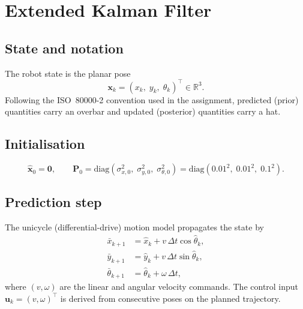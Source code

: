 \documentclass[a4paper,11pt]{report}
\begin{document}
\section{Extended Kalman Filter}

\subsection{State and notation}

The robot state is the planar pose
\begin{equation}
  \bm{x}_k = (x_k,\; y_k,\; \theta_k)^\top \in \mathbb{R}^3.
\end{equation}
Following the ISO~80000-2 convention used in the assignment, predicted (prior) quantities carry an overbar and updated (posterior) quantities carry a hat.

\subsection{Initialisation}

\begin{equation}
  \hat{\bm{x}}_0 = \bm{0}, \qquad
  \mathbf{P}_0 = \mathrm{diag}\!\left(\sigma_{x,0}^2,\; \sigma_{y,0}^2,\; \sigma_{\theta,0}^2\right)
               = \mathrm{diag}(0.01^2,\; 0.01^2,\; 0.1^2).
\end{equation}

\subsection{Prediction step}

The unicycle (differential-drive) motion model propagates the state by
\begin{align}
  \bar{x}_{k+1}      &= \hat{x}_k + v\,\Delta t\cos\hat\theta_k, \\
  \bar{y}_{k+1}      &= \hat{y}_k + v\,\Delta t\sin\hat\theta_k, \\
  \bar\theta_{k+1}   &= \hat\theta_k + \omega\,\Delta t,
\end{align}
where $(v, \omega)$ are the linear and angular velocity commands.  The control input $\mathbf{u}_k = (v, \omega)^\top$ is derived from consecutive poses on the planned trajectory.
\end{document}
